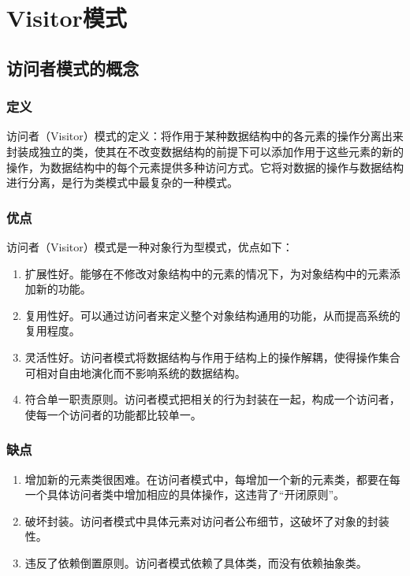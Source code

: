 \chapter{Visitor模式}
\section{访问者模式的概念}
\subsection{定义}
访问者（Visitor）模式的定义：将作用于某种数据结构中的各元素的操作分离出来封装成独立的类，使其在不改变数据结构的前提下可以添加作用于这些元素的新的操作，为数据结构中的每个元素提供多种访问方式。它将对数据的操作与数据结构进行分离，是行为类模式中最复杂的一种模式。
\subsection{优点}
访问者（Visitor）模式是一种对象行为型模式，优点如下：
\begin{enumerate}
	\item 扩展性好。能够在不修改对象结构中的元素的情况下，为对象结构中的元素添加新的功能。
	\item 复用性好。可以通过访问者来定义整个对象结构通用的功能，从而提高系统的复用程度。
	\item 灵活性好。访问者模式将数据结构与作用于结构上的操作解耦，使得操作集合可相对自由地演化而不影响系统的数据结构。
	\item 符合单一职责原则。访问者模式把相关的行为封装在一起，构成一个访问者，使每一个访问者的功能都比较单一。
\end{enumerate}
\subsection{缺点}
\begin{enumerate}
	\item 增加新的元素类很困难。在访问者模式中，每增加一个新的元素类，都要在每一个具体访问者类中增加相应的具体操作，这违背了“开闭原则”。
	\item 破坏封装。访问者模式中具体元素对访问者公布细节，这破坏了对象的封装性。
	\item 违反了依赖倒置原则。访问者模式依赖了具体类，而没有依赖抽象类。
\end{enumerate}
